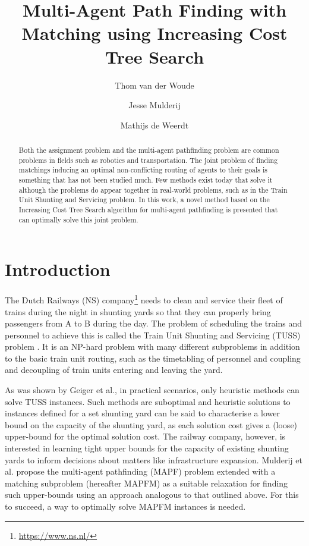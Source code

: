 \documentclass[english]{article}
\begin{document}
	
	\title{Multi-Agent Path Finding with Matching using Increasing Cost Tree Search}
	
	\author{Thom van der Woude\and Jesse Mulderij\and Mathijs de Weerdt}
	\date{}
	
	\maketitle
	
	\begin{abstract}
		Both the assignment problem and the multi-agent pathfinding problem are common problems in fields such as robotics and transportation. The joint problem of finding matchings inducing an optimal non-conflicting routing of agents to their goals is something that has not been studied much. Few methods exist today that solve it although the problems do appear together in real-world problems, such as in the Train Unit Shunting and Servicing problem. In this work, a novel method based on the Increasing Cost Tree Search algorithm for multi-agent pathfinding is presented that can optimally solve this joint problem.
	\end{abstract}
	
	\section{Introduction}
	The Dutch Railways (NS) company\footnote{\url{https://www.ns.nl/}} needs to clean and service their fleet of trains during the night in shunting yards so that they can properly bring passengers from A to B during the day. 
	The problem of scheduling the trains and personnel to achieve this is called the Train Unit Shunting and Servicing (TUSS) problem \cite{mulderij2020}. 
	It is an NP-hard problem with many different subproblems in addition to the basic train unit routing, such as the timetabling of personnel and coupling and decoupling of train units entering and leaving the yard. %
	
	As was shown by Geiger et al.\cite{geiger2018}, in practical scenarios, only heuristic methods can solve TUSS instances. 
	Such methods are suboptimal and heuristic solutions to instances defined for a set shunting yard can be said to characterise a lower bound on the capacity of the shunting yard, as each solution cost gives a (loose) upper-bound for the optimal solution cost. 
	The railway company, however, is interested in learning tight upper bounds for the capacity of existing shunting yards to inform decisions about matters like infrastructure expansion. 
	Mulderij et al. \cite{mulderij2020} propose the multi-agent pathfinding (MAPF) problem \cite{stern2019} extended with a matching subproblem (hereafter MAPFM) as a suitable relaxation for finding such upper-bounds using an approach analogous to that outlined above.
	For this to succeed, a way to optimally solve MAPFM instances is needed.
\end{document}
